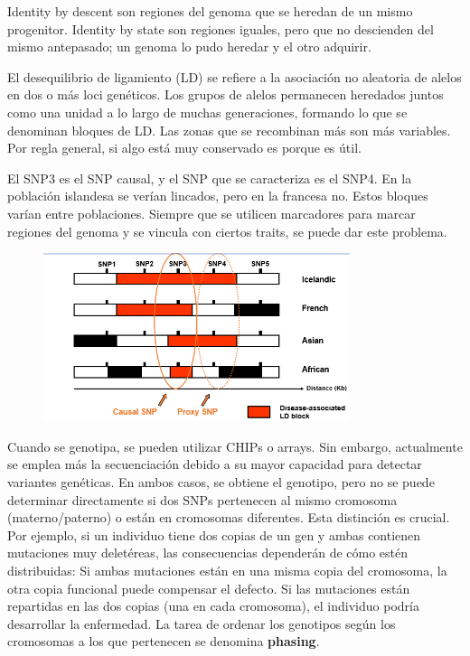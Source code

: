 Identity by descent son regiones del genoma que se heredan de un mismo progenitor. Identity by state son regiones iguales, pero que no descienden del mismo antepasado; un genoma lo pudo heredar y el otro adquirir.

El desequilibrio de ligamiento (LD) se refiere a la asociación no aleatoria de alelos en dos o más loci genéticos. Los grupos de alelos permanecen heredados juntos como una unidad a lo largo de muchas generaciones, formando lo que se denominan bloques de LD. Las zonas que se recombinan más son más variables. Por regla general, si algo está muy conservado es porque es útil.

El SNP3 es el SNP causal, y el SNP que se caracteriza es el SNP4. En la población islandesa se verían lincados, pero en la francesa no. Estos bloques varían entre poblaciones. Siempre que se utilicen marcadores para marcar regiones del genoma y se vincula con ciertos traits, se puede dar este problema. 

\begin{figure}[htbp]
\centering
\includegraphics[width = 0.8\textwidth]{figs/ld-blocks.png}
\end{figure}

Cuando se genotipa, se pueden utilizar CHIPs o arrays. Sin embargo, actualmente se emplea más la secuenciación debido a su mayor capacidad para detectar variantes genéticas. En ambos casos, se obtiene el genotipo, pero no se puede determinar directamente si dos SNPs pertenecen al mismo cromosoma (materno/paterno) o están en cromosomas diferentes. Esta distinción es crucial. Por ejemplo, si un individuo tiene dos copias de un gen y ambas contienen mutaciones muy deletéreas, las consecuencias dependerán de cómo estén distribuidas:
Si ambas mutaciones están en una misma copia del cromosoma, la otra copia funcional puede compensar el defecto.
Si las mutaciones están repartidas en las dos copias (una en cada cromosoma), el individuo podría desarrollar la enfermedad.
La tarea de ordenar los genotipos según los cromosomas a los que pertenecen se denomina \textbf{phasing}.

